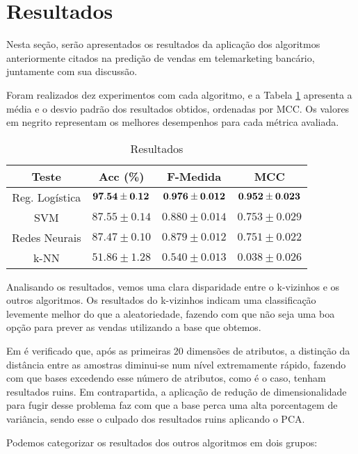\section{Resultados}

Nesta seção, serão apresentados os resultados da aplicação dos algoritmos anteriormente citados na predição de vendas em telemarketing bancário, juntamente com sua discussão.

Foram realizados dez experimentos com cada algoritmo, e a Tabela \ref{tab:tabela_resultados} apresenta a média e o desvio padrão dos resultados obtidos, ordenadas por MCC. Os valores em negrito representam os melhores desempenhos para cada métrica avaliada.

\begin{table}[ht]
	\centering
  \begin{tabular}{  c | c | c | c }
    \hline 
    Teste & Acc (\%) & F-Medida & MCC\\ \hline 
    Reg. Logística & $\bf{97.54 \pm 0.12} $ & $\bf{0.976 \pm 0.012}$ & $\bf{0.952 \pm 0.023}$ \\ 
    SVM & $87.55 \pm 0.14 $ & $0.880 \pm 0.014$ & $0.753 \pm 0.029$ \\ 
    Redes Neurais & $87.47 \pm 0.10 $ & $0.879 \pm 0.012$ & $0.751 \pm 0.022$ \\ 
    k-NN & $51.86 \pm 1.28 $ & $0.540 \pm 0.013$ & $0.038 \pm 0.026$ \\ 
    \hline 
  \end{tabular}
  \caption{Resultados}
  \label{tab:tabela_resultados}
\end{table} 

Analisando os resultados, vemos uma clara disparidade entre o k-vizinhos e os outros algoritmos. Os resultados do k-vizinhos indicam uma classificação levemente melhor do que a aleatoriedade, fazendo com que não seja uma boa opção para prever as vendas utilizando a base que obtemos.

Em \cite{knn_explicacao} é verificado que, após as primeiras 20 dimensões de atributos, a distinção da distância entre as amostras diminui-se num nível extremamente rápido, fazendo com que bases excedendo esse número de atributos, como é o caso, tenham resultados ruins. Em contrapartida, a aplicação de redução de dimensionalidade para fugir desse problema faz com que a base perca uma alta porcentagem de variância, sendo esse o culpado dos resultados ruins aplicando o PCA.

Podemos categorizar os resultados dos outros algoritmos em dois grupos:


